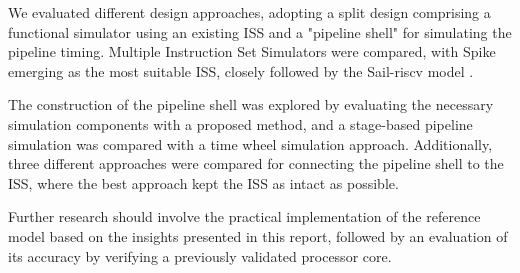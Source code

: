 We evaluated different design approaches, adopting a split design comprising a functional simulator using an existing ISS and a "pipeline shell" for simulating the pipeline timing. Multiple Instruction Set Simulators were compared, with Spike \cite{noauthor_spike_2023} emerging as the most suitable ISS, closely followed by the Sail-riscv model \cite{noauthor_riscv_2023}. 

The construction of the pipeline shell was explored by evaluating the necessary simulation components with a proposed method, and a stage-based pipeline simulation was compared with a time wheel simulation approach. Additionally, three different approaches were compared for connecting the pipeline shell to the ISS, where the best approach kept the ISS as intact as possible.

Further research should involve the practical implementation of the reference model based on the insights presented in this report, followed by an evaluation of its accuracy by verifying a previously validated processor core.








%
%

